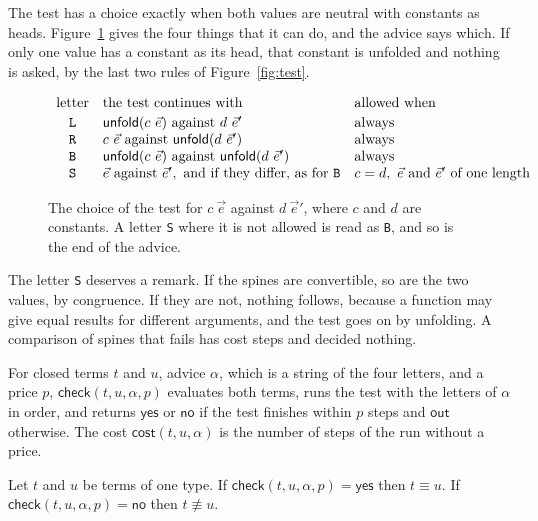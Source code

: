 \documentclass[acmsmall,nonacm,screen]{acmart}
\newcommand{\kw}[1]{\mathsf{#1}}
\newcommand{\conv}{\equiv}
\newcommand{\chk}[4]{\kw{check}(#1, #2, #3, #4)}
\newcommand{\yes}{\kw{yes}}
\newcommand{\no}{\kw{no}}
\newcommand{\out}{\kw{out}}
\newcommand{\cost}[3]{\kw{cost}(#1, #2, #3)}
\newcommand{\adv}[1]{\textup{\texttt{#1}}}
\begin{document}
The test has a choice exactly when both values are neutral with constants as heads.
Figure~\ref{fig:choice} gives the four things that it can do, and the advice says which. If
only one value has a constant as its head, that constant is unfolded and nothing is asked,
by the last two rules of Figure~\ref{fig:test}.

\begin{figure}
\[
\begin{array}{c@{\quad}l@{\quad}l}
\text{letter} & \text{the test continues with} & \text{allowed when} \\[2pt]
\adv{L} & \kw{unfold}(c\ \vec{e}) \text{ against } d\ \vec{e}' & \text{always} \\
\adv{R} & c\ \vec{e} \text{ against } \kw{unfold}(d\ \vec{e}') & \text{always} \\
\adv{B} & \kw{unfold}(c\ \vec{e}) \text{ against } \kw{unfold}(d\ \vec{e}') & \text{always} \\
\adv{S} & \vec{e} \text{ against } \vec{e}', \text{ and if they differ, as for } \adv{B} & c = d,\ \vec{e} \text{ and } \vec{e}' \text{ of one length}
\end{array}
\]
\caption{The choice of the test for $c\ \vec{e}$ against $d\ \vec{e}'$, where $c$ and $d$ are
constants. A letter \adv{S} where it is not allowed is read as \adv{B}, and so is the end of
the advice.}
\label{fig:choice}
\end{figure}

The letter \adv{S} deserves a remark. If the spines are convertible, so are the two values,
by congruence. If they are not, nothing follows, because a function may give equal results
for different arguments, and the test goes on by unfolding. A comparison of spines that
fails has cost steps and decided nothing.

\begin{definition}[Check]
\label{def:check}
For closed terms $t$ and $u$, advice $\alpha$, which is a string of the four letters, and a
price $p$, $\chk{t}{u}{\alpha}{p}$ evaluates both terms, runs the test
with the letters of $\alpha$ in order, and returns $\yes$ or $\no$ if the test finishes
within $p$ steps and $\out$ otherwise. The cost $\cost{t}{u}{\alpha}$ is the number of steps
of the run without a price.
\end{definition}

\begin{theorem}[Soundness]
\label{thm:sound}
Let $t$ and $u$ be terms of one type. If $\chk{t}{u}{\alpha}{p} = \yes$ then $t \conv u$. If
$\chk{t}{u}{\alpha}{p} = \no$ then $t \not\conv u$.
\end{theorem}
\end{document}
